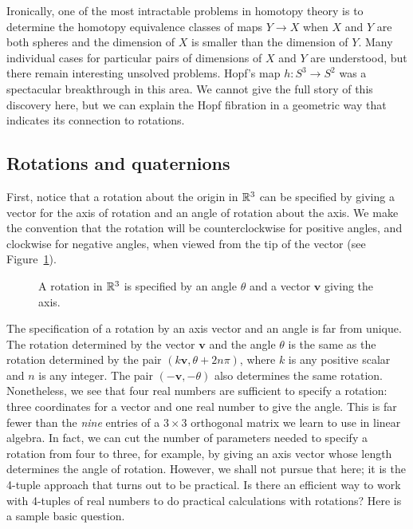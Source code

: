 \documentclass[11pt]{article}
\newcommand{\R}{\Bbb R}
\begin{document}
Ironically, one of the most intractable problems in homotopy theory is
to determine the homotopy equivalence classes of maps $Y\to X$ when $X$
and $Y$ are both spheres and the dimension of $X$ is smaller than the
dimension of $Y$.  Many individual cases for particular pairs of
dimensions of $X$ and $Y$ are understood, but there remain interesting
unsolved problems. Hopf's map $h\colon S^3 \rightarrow S^2$ was a
spectacular breakthrough in this area.  We cannot give the full story of
this discovery here, but we can explain the Hopf fibration in a
geometric way that indicates its connection to rotations.

\subsection*{Rotations and quaternions}

First, notice that a rotation about the origin in $\R^3$ can be
specified by giving a vector for the axis of rotation and an angle of
rotation about the axis.  We make the convention that the rotation will be
counterclockwise for positive angles, and clockwise for negative angles,
when viewed from the tip of the vector (see Figure~\ref{vectangrot}).

\begin{figure}[h]
\begin{center}

\end{center}
\vspace*{-.2in}\caption{\small A rotation in $\R^3$ is specified by an
angle $\theta$
and a vector ${\mathbf v}$ giving the axis.}
\label{vectangrot}
\end{figure}

The specification of a rotation by an axis vector and an angle is far
from unique.  The rotation determined by the vector ${\mathbf v}$ and
the angle $\theta$ is the same as the rotation determined by the pair
$(k{\mathbf v},\theta + 2n\pi)$, where $k$ is any positive scalar and
$n$ is any integer.  The pair $(-{\mathbf v},-\theta)$ also determines
the same rotation.  Nonetheless, we see that four real numbers are
sufficient to specify a rotation: three coordinates for a vector and one
real number to give the angle.  This is far fewer than the {\em nine}
entries of a $3\times 3$ orthogonal matrix we learn to use in linear
algebra.  In fact, we can cut the number of parameters needed to
specify a rotation from four to three, for example, by giving an axis
vector whose length determines the angle of rotation.  However, we shall
not pursue that here; it is the 4-tuple approach that turns out to be
practical.  Is there an efficient way to work with 4-tuples of real
numbers to do practical calculations with rotations?  Here is a sample
basic question.
\end{document}
